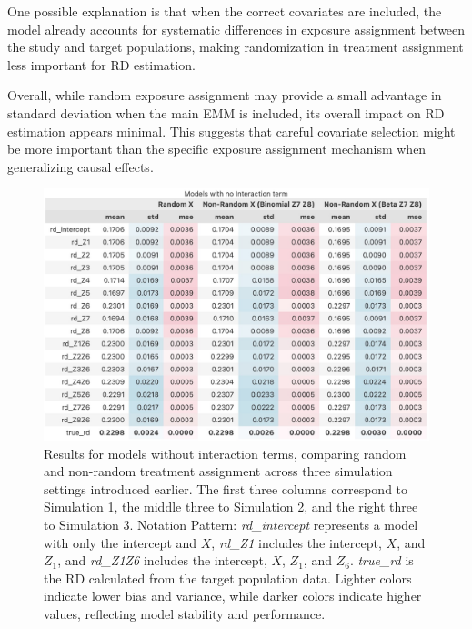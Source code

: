 \documentclass[12pt,oneside]{amsart}
\theoremstyle{definition}
\theoremstyle{remark}
\numberwithin{equation}{section}
\begin{document}
One possible explanation is that when the correct covariates are included, the model already accounts for systematic differences in exposure assignment between the study and target populations, making randomization in treatment assignment less important for RD estimation.

Overall, while random exposure assignment may provide a small advantage in standard deviation when the main EMM is included, its overall impact on RD estimation appears minimal. This suggests that careful covariate selection might be more important than the specific exposure assignment mechanism when generalizing causal effects.




\begin{figure}[h]
    \centering
    \includegraphics[scale=0.22]{Report/Figure/om.jpg}
    \caption{Results for models without interaction terms, comparing random and non-random treatment assignment across three simulation settings introduced earlier. The first three columns correspond to Simulation 1, the middle three to Simulation 2, and the right three to Simulation 3. Notation Pattern: \textit{rd\_intercept} represents a model with only the intercept and $X$, \textit{rd\_Z1} includes the intercept, $X$, and $Z_1$, and \textit{rd\_Z1Z6} includes the intercept, $X$, $Z_1$, and $Z_6$. \textit{true\_rd} is the RD calculated from the target population data. Lighter colors indicate lower bias and variance, while darker colors indicate higher values, reflecting model stability and performance.}
    \label{fig:om}
\end{figure}
\end{document}

